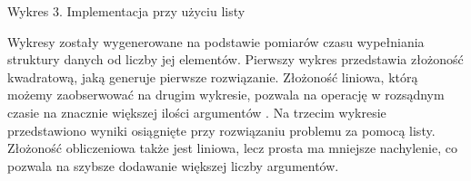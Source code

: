 \documentclass[12pt,a4paper]{article}
\begin{document}
Wykres 3. Implementacja przy użyciu listy \newline

Wykresy zostały wygenerowane na podstawie pomiarów czasu wypełniania struktury danych od liczby jej elementów. Pierwszy wykres przedstawia złożoność kwadratową, jaką generuje pierwsze rozwiązanie. Złożoność liniowa, którą możemy zaobserwować na drugim wykresie, pozwala na operację w rozsądnym czasie na znacznie większej ilości argumentów .
Na trzecim wykresie przedstawiono wyniki osiągnięte przy rozwiązaniu problemu za pomocą listy. Złożoność obliczeniowa także jest liniowa, lecz prosta ma mniejsze nachylenie, co pozwala na szybsze dodawanie większej liczby argumentów.    \newline
\end{document}
